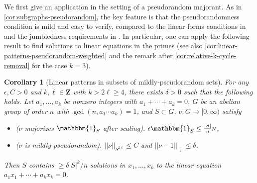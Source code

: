 \documentclass[reqno,11pt]{amsart}
\newtheorem{corollary}[theorem]{Corollary}
\theoremstyle{definition}
\theoremstyle{remark}
\numberwithin{equation}{section}
\newcommand{\Z}{\mathbf{Z}}
\newcommand{\one}{\mathbbm{1}}
\newcommand{\sq}{_{\substack{ \\ \square}}}
\begin{document}

We first give an application in the setting of a pseudorandom majorant. As in \cref{cor:subgraphs-pseudorandom}, the key feature is that the pseudorandomness condition is mild and easy to verify, compared to the linear forms conditions in \cite{conlon2014green,tao2006gaussian,tao2007ergodic} and the jumbledness requirements in \cite{conlon2014extremal}. In particular, one can apply the following result to find solutions to linear equations in the primes (see also \cref{cor:linear-patterns-pseudorandom-weighted} and the remark after \cref{cor:relative-k-cycle-removal} for the case $k = 3$). %



\begin{corollary}[Linear patterns in subsets of mildly-pseudorandom sets] \label{cor:linear-patterns-pseudorandom}
For any $\epsilon, C > 0$ and $k, \ell \in \Z$ with $k > 2\ell \ge 4$, there exists $\delta > 0$ such that the following holds. Let $a_1, \ldots, a_k$ be nonzero integers with $a_1 + \cdots + a_k = 0$, $G$ be an abelian group of order $n$ with $\gcd(n, a_1 \cdots a_k) = 1$, and $S \subset G$, $\nu : G \to [0, \infty)$ satisfy
\begin{itemize}
    \item[$(i)$] \emph{($\nu$ majorizes $\one_S$ after scaling).}  $\epsilon \one_S \le \frac{|S|}{n}\nu$,
    \item[$(ii)$] \emph{($\nu$ is mildly-pseudorandom).}  $||\nu||_{S^{2\ell}} \le C$ and $||\nu - 1||\sq \le \delta$. 
\end{itemize}
Then $S$ contains $\ge \delta |S|^k/n$ solutions in $x_1, \ldots, x_k$ to the linear equation $a_1 x_1 + \cdots + a_k x_k = 0$. 
\end{corollary}
\end{document}
